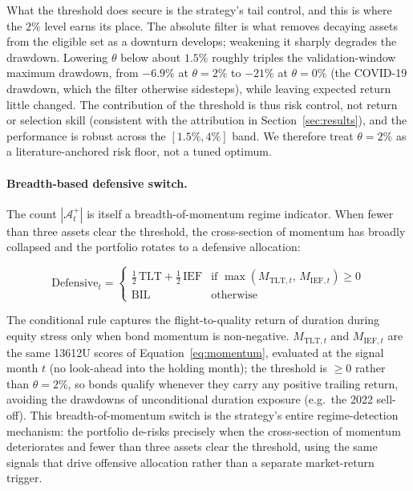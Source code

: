 What the threshold does secure is the strategy's tail control, and this is
where the $2\%$ level earns its place. The absolute filter is what removes
decaying assets from the eligible set as a downturn develops; weakening it sharply
degrades the drawdown. Lowering $\theta$ below about $1.5\%$ roughly triples the
validation-window maximum drawdown, from $-6.9\%$ at $\theta=2\%$ to $-21\%$ at
$\theta=0\%$ (the COVID-19 drawdown, which the filter otherwise sidesteps), while
leaving expected return little changed. The contribution of the threshold is thus
risk control, not return or selection skill (consistent with the attribution in
Section~\ref{sec:results}), and the performance is robust across the
$[1.5\%, 4\%]$ band. We therefore treat $\theta = 2\%$ as a literature-anchored
risk floor, not a tuned optimum.

\paragraph{Breadth-based defensive switch.}
The count $|\mathcal{A}_t^+|$ is itself a breadth-of-momentum regime indicator.
When fewer than three assets clear the threshold, the cross-section of momentum
has broadly collapsed and the portfolio rotates to a defensive allocation:

\begin{equation}
\text{Defensive}_t =
\begin{cases}
\tfrac{1}{2}\,\text{TLT} + \tfrac{1}{2}\,\text{IEF} & \text{if } \max\!\left(M_{\text{TLT},t},\, M_{\text{IEF},t}\right) \geq 0 \\
\text{BIL} & \text{otherwise}
\end{cases}
\label{eq:defensive}
\end{equation}

The conditional rule captures the flight-to-quality return of duration during
equity stress \citep{barroso2015} only when bond momentum is non-negative.
$M_{\text{TLT},t}$ and $M_{\text{IEF},t}$ are the same 13612U scores of
Equation~\eqref{eq:momentum}, evaluated at the signal month $t$ (no look-ahead into
the holding month); the threshold is $\geq 0$ rather than $\theta = 2\%$, so bonds
qualify whenever they carry any positive trailing return, avoiding the drawdowns of
unconditional duration exposure (e.g.\ the 2022 sell-off).
This breadth-of-momentum switch is the strategy's entire regime-detection
mechanism: the portfolio de-risks precisely when the cross-section of momentum
deteriorates and fewer than three assets clear the threshold, using the same signals
that drive offensive allocation rather than a separate market-return trigger.

